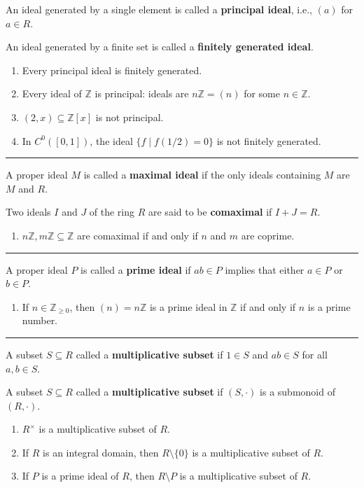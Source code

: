 \documentclass[12pt]{article}
\newcommand{\keyword}[1]{\textbf{#1}}
\newcommand{\sepline}{\rule{\textwidth}{0.4pt}}
\theoremstyle{definition}
\newcommand{\Z}{\mathbb{Z}}
\newcommand{\Zpos}{\mathbb{Z}_{\geq0}}
\newcommand{\<}{\left\langle}
\renewcommand{\>}{\right\rangle}
\newcommand{\seq}{\subseteq}
\begin{document}
An ideal generated by a single element is called a \keyword{principal ideal}, i.e., $(a)$ for $a \in R$.

An ideal generated by a finite set is called a \keyword{finitely generated ideal}.

\begin{enumerate}
    \item Every principal ideal is finitely generated.
    
    \item Every ideal of $\Z$ is principal: ideals are $n\Z = (n)$ for some $n \in \Z$.
    
    \item $(2, x) \seq \Z[x]$ is not principal.
    
    \item In $C^0([0,1])$, the ideal $\{f \mid f(1/2) = 0\}$ is not finitely generated.
\end{enumerate}

\sepline

A proper ideal $M$ is called a \keyword{maximal ideal} if the only ideals containing $M$ are $M$ and $R$.

Two ideals $I$ and $J$ of the ring $R$ are said to be \keyword{comaximal} if $I + J = R$.

\begin{enumerate}
    \item $n\Z, m\Z \seq \Z$ are comaximal if and only if $n$ and $m$ are coprime.
\end{enumerate}

\sepline

A proper ideal $P$ is called a \keyword{prime ideal} if $ab \in P$ implies that either $a \in P$ or $b \in P$.

\begin{enumerate}
    \item If $n \in \Zpos$, then $(n) = n\Z$ is a prime ideal in $\Z$ if and only if $n$ is a prime number.
\end{enumerate}

\sepline

A subset $S \seq R$ called a \keyword{multiplicative subset} if $1 \in S$ and $ab \in S$ for all $a, b \in S$. 

A subset $S \seq R$ called a \keyword{multiplicative subset} if $(S, \cdot)$ is a submonoid of $(R, \cdot)$. 

\begin{enumerate}
    \item $R^\times$ is a multiplicative subset of $R$.
    
    \item If $R$ is an integral domain, then $R \setminus \{0\}$ is a multiplicative subset of $R$.
    
    \item If $P$ is a prime ideal of $R$, then $R \setminus P$ is a multiplicative subset of $R$.
\end{enumerate}
\end{document}

